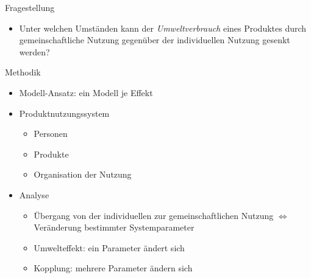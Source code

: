 \documentclass[beamer, xcolor={table,usenames,dvipsnames}]{beamer}
\begin{document}
	
	\begin{frame}{Fragestellung}
      \begin{block}{}
	        	\begin{itemize}
	        		\item[] Unter welchen Umständen kann der \textit{Umweltverbrauch} eines Produktes durch gemeinschaftliche Nutzung gegenüber der individuellen Nutzung gesenkt werden?
	        	\end{itemize}
      \end{block}
	\end{frame}
	
	\begin{frame}{Methodik}
            \begin{itemize}
                \pause
                \item Modell-Ansatz: ein Modell je Effekt
                \pause
                \item Produktnutzungssystem
                \begin{itemize}
                    \item Personen 
                    \item Produkte
                    \item Organisation der Nutzung
                \end{itemize}
                \pause
                \item Analyse
                \begin{itemize}
                    \item Übergang von der individuellen zur gemeinschaftlichen Nutzung $\Leftrightarrow$ Veränderung bestimmter Systemparameter
                    \item Umwelteffekt: ein Parameter ändert sich
                    \item Kopplung: mehrere Parameter ändern sich
                \end{itemize}
            \end{itemize}
	\end{frame}
\end{document}
